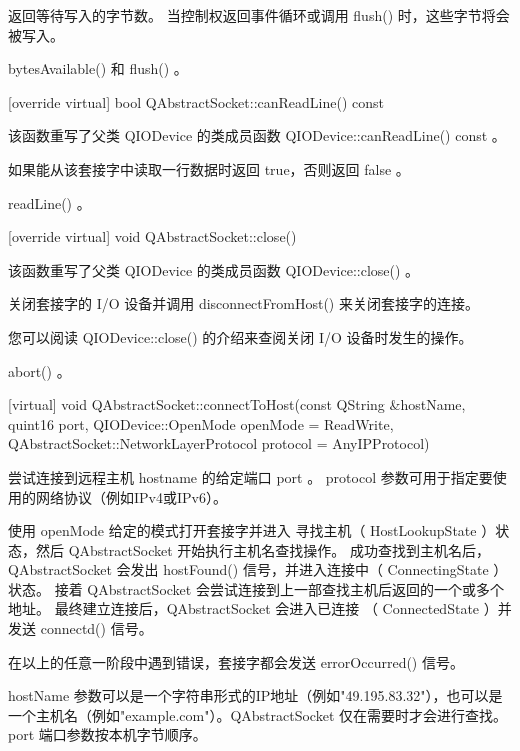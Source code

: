 返回等待写入的字节数。 当控制权返回事件循环或调用 flush() 时，这些字节将会被写入。



\begin{notice}[另请查阅]
 bytesAvailable() 和 flush() 。
\end{notice}

[override virtual] bool QAbstractSocket::canReadLine() const

该函数重写了父类 QIODevice 的类成员函数 QIODevice::canReadLine() const 。

如果能从该套接字中读取一行数据时返回 true，否则返回 false 。



\begin{notice}[另请查阅]
readLine() 。
\end{notice}

[override virtual] void QAbstractSocket::close()

该函数重写了父类 QIODevice 的类成员函数 QIODevice::close() 。

关闭套接字的 I/O 设备并调用 disconnectFromHost() 来关闭套接字的连接。

您可以阅读 QIODevice::close() 的介绍来查阅关闭 I/O 设备时发生的操作。


\begin{notice}[另请查阅]
abort() 。
\end{notice}


[virtual] void QAbstractSocket::connectToHost(const QString \&hostName,
quint16 port, QIODevice::OpenMode openMode = ReadWrite,
QAbstractSocket::NetworkLayerProtocol protocol = AnyIPProtocol)

尝试连接到远程主机 hostname 的给定端口 port 。 protocol 参数可用于指定要使用的网络协议（例如IPv4或IPv6）。

使用 openMode 给定的模式打开套接字并进入 寻找主机（ HostLookupState ）状态，然后 QAbstractSocket 开始执行主机名查找操作。 成功查找到主机名后， QAbstractSocket 会发出 hostFound() 信号，并进入连接中（ ConnectingState ）状态。 接着 QAbstractSocket 会尝试连接到上一部查找主机后返回的一个或多个地址。 最终建立连接后，QAbstractSocket 会进入已连接 （ ConnectedState ）并发送 connectd() 信号。

在以上的任意一阶段中遇到错误，套接字都会发送 errorOccurred() 信号。

hostName 参数可以是一个字符串形式的IP地址（例如"49.195.83.32"），也可以是一个主机名（例如"example.com"）。QAbstractSocket 仅在需要时才会进行查找。 port 端口参数按本机字节顺序。


